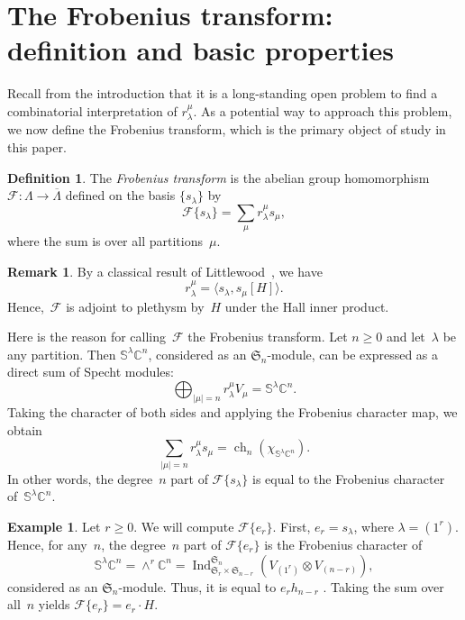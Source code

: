 \documentclass[11pt]{article}
\theoremstyle{definition}
\newtheorem{defi}[theo]{Definition}
\newtheorem{exam}[theo]{Example}
\newtheorem{rema}[theo]{Remark}
\numberwithin{equation}{section}
\newcommand{\K}{\mathbb{C}}
\newcommand{\Fa}{\mathscr{F}}
\newcommand{\F}[1]{\mathscr{F}\{#1\}}
\newcommand{\Sym}{\mathfrak{S}}
\DeclareMathOperator{\ch}{ch}
\begin{document}
\section{The Frobenius transform: definition and basic properties}
\label{section:basics}
Recall from the introduction that it is a long-standing open problem to find a combinatorial interpretation of $r_\lambda^\mu$. As a potential way to approach this problem, we now define the Frobenius transform, which is the primary object of study in this paper.
\begin{defi}
    The \emph{Frobenius transform} is the abelian group homomorphism $\Fa \colon \Lambda \to \overline{\Lambda}$ defined on the basis $\{s_\lambda\}$ by \[\F{s_\lambda} = \sum_\mu r_{\lambda}^\mu s_\mu,\] where the sum is over all partitions~$\mu$.
\end{defi}
\begin{rema}\label{remark:halladjoint}
By a classical result of Littlewood~\cite{MR1576896}, we have \[r_\lambda^\mu = \langle s_\lambda, s_\mu[H] \rangle.\] Hence,~$\Fa$ is adjoint to plethysm by~$H$ under the Hall inner product.
\end{rema}
Here is the reason for calling~$\Fa$ the Frobenius transform. Let $n \geq 0$ and let~$\lambda$ be any partition. Then $\mathbb{S}^\lambda \K^n$, considered as an $\Sym_n$-module, can be expressed as a direct sum of Specht modules:
\[\bigoplus_{|\mu| = n} r_{\lambda}^\mu V_\mu = \mathbb{S}^\lambda \K^n.\]
Taking the character of both sides and applying the Frobenius character map, we obtain \begin{equation}\label{equation:fslambdan1}\sum_{|\mu| = n} r_{\lambda}^\mu s_\mu = \ch_n(\chi_{\mathbb{S}^\lambda \K^n}).\end{equation} In other words, the degree~$n$ part of $\F{s_\lambda}$ is equal to the Frobenius character of~$\mathbb{S}^\lambda \K^n$.

\begin{exam}\label{example:fer}
    Let $r \geq 0$. We will compute $\F{e_r}$. First, $e_r = s_{\lambda}$, where $\lambda = (1^r)$. Hence, for any~$n$, the degree~$n$ part of $\F{e_r}$ is the Frobenius character of \[\mathbb{S}^{\lambda} \K^n = \wedge^r \K^n = \operatorname{Ind}_{\Sym_r \times \Sym_{n - r}}^{\Sym_n} (V_{(1^r)} \otimes V_{(n-r)}),\] considered as an $\Sym_n$-module. Thus, it is equal to $e_r h_{n - r}$ \cite[Proposition~7.18.2]{MR4621625}. Taking the sum over all~$n$ yields $\F{e_r} = e_r \cdot H$.
\end{exam}
\end{document}
